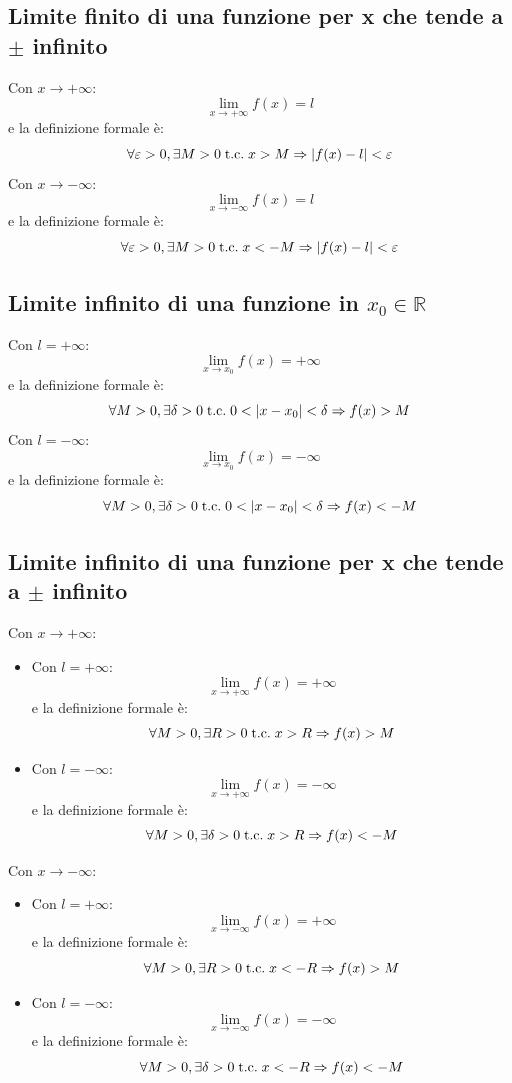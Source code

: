 \documentclass[a4paper,12pt,openright]{book}
\begin{document}
	\subsection{Limite finito di una funzione per x che tende a $\pm$ infinito}
	Con $x \rightarrow + \infty$:
	\[\lim_{x \rightarrow + \infty} f(x) = l\]
	e la definizione formale è:
	\[\forall \varepsilon > 0, \exists M > 0 \;\text{t.c.}\; x > M \Rightarrow |f(x) - l| < \varepsilon\]
	Con $x \rightarrow - \infty$:
	\[\lim_{x \rightarrow - \infty} f(x) = l\]
	e la definizione formale è:
	\[\forall \varepsilon > 0, \exists M > 0 \;\text{t.c.}\; x < -M \Rightarrow |f(x) - l| < \varepsilon\]
	
	\subsection{Limite infinito di una funzione in $x_0 \in \mathbb{R}$}
	Con $l = +\infty$:
	\[\lim_{x \rightarrow x_0} f(x) = + \infty\]
	e la definizione formale è:
	\[\forall M > 0, \exists \delta > 0 \;\text{t.c.}\; 0 < |x - x_0| < \delta \Rightarrow f(x) > M\]
	Con $l = -\infty$:
	\[\lim_{x \rightarrow x_0} f(x) = - \infty\]
	e la definizione formale è:
	\[\forall M > 0, \exists \delta > 0 \;\text{t.c.}\; 0 < |x - x_0| < \delta \Rightarrow f(x) < -M\]
	
	\subsection{Limite infinito di una funzione per x che tende a $\pm$ infinito}
	Con $x \rightarrow +\infty$:
	\begin{itemize}
		\item Con $l = +\infty$:
		\[\lim_{x \rightarrow + \infty} f(x) = + \infty\]
		e la definizione formale è:
		\[\forall M > 0, \exists R > 0 \;\text{t.c.}\; x > R \Rightarrow f(x) > M\]
		\item Con $l = -\infty$:
		\[\lim_{x \rightarrow + \infty} f(x) = - \infty\]
		e la definizione formale è:
		\[\forall M > 0, \exists \delta > 0 \;\text{t.c.}\; x > R \Rightarrow f(x) < -M\]
	\end{itemize}
	Con $x \rightarrow -\infty$:
	\begin{itemize}
		\item Con $l = +\infty$:
		\[\lim_{x \rightarrow - \infty} f(x) = + \infty\]
		e la definizione formale è:
		\[\forall M > 0, \exists R > 0 \;\text{t.c.}\; x < -R \Rightarrow f(x) > M\]
		\item Con $l = -\infty$:
		\[\lim_{x \rightarrow - \infty} f(x) = - \infty\]
		e la definizione formale è:
		\[\forall M > 0, \exists \delta > 0 \;\text{t.c.}\; x < -R \Rightarrow f(x) < -M\]
	\end{itemize}
	
\end{document}
